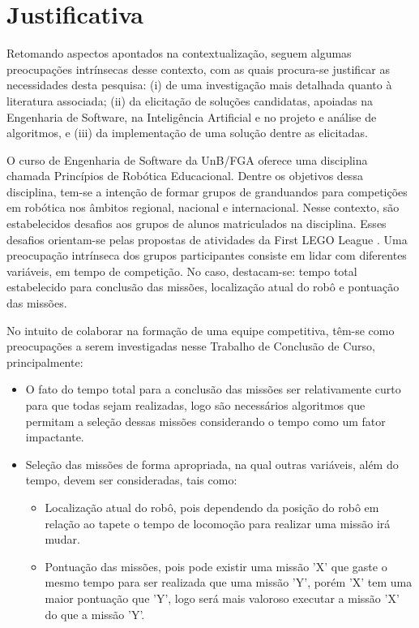\section{Justificativa}

Retomando aspectos apontados na contextualização, seguem algumas preocupações intrínsecas desse contexto, com as quais procura-se justificar as necessidades desta pesquisa: (i) de uma investigação mais detalhada quanto à literatura associada; (ii) da elicitação de soluções candidatas, apoiadas na Engenharia de Software, na Inteligência Artificial e no projeto e análise de algoritmos, e (iii) da implementação de uma solução dentre as elicitadas.

O curso de Engenharia de Software da UnB/FGA oferece uma disciplina chamada Princípios de Robótica Educacional. Dentre os objetivos dessa disciplina, tem-se a intenção de formar grupos de granduandos para competições em robótica nos âmbitos regional, nacional e internacional. Nesse contexto, são estabelecidos desafios aos grupos de alunos matriculados na disciplina. Esses desafios orientam-se pelas propostas de atividades da First LEGO League \cite{kamenfirst}. Uma preocupação intrínseca dos grupos participantes consiste em lidar com diferentes variáveis, em tempo de competição. No caso, destacam-se: tempo total estabelecido para conclusão das missões, localização atual do robô e pontuação das missões.

No intuito de colaborar na formação de uma equipe competitiva, têm-se como preocupações a serem investigadas nesse Trabalho de Conclusão de Curso, principalmente:

\begin{itemize}
\item O fato do tempo total para a conclusão das missões ser relativamente curto para que todas sejam realizadas, logo são necessários algoritmos que permitam a seleção dessas missões considerando o tempo como um fator impactante.

\item Seleção das missões de forma apropriada, na qual outras variáveis, além do tempo, devem ser consideradas, tais como: 
\begin{itemize}
\item Localização atual do robô, pois dependendo da posição do robô em relação ao tapete o tempo de locomoção para realizar uma missão irá mudar.   
\item Pontuação das missões, pois pode existir uma missão 'X' que gaste o mesmo tempo para ser realizada que uma missão 'Y', porém 'X' tem uma maior pontuação que 'Y', logo será mais valoroso executar a missão 'X' do que a missão 'Y'.
\end{itemize} 
\end{itemize}
 

